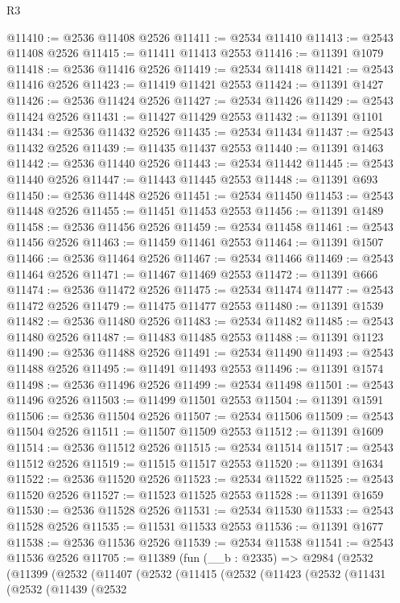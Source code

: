 \begin{lexlean}{R3}
\begin{coremodule}
@11410 := @2536 @11408 @2526
@11411 := @2534 @11410
@11413 := @2543 @11408 @2526
@11415 := @11411 @11413 @2553
@11416 := @11391 @1079
@11418 := @2536 @11416 @2526
@11419 := @2534 @11418
@11421 := @2543 @11416 @2526
@11423 := @11419 @11421 @2553
@11424 := @11391 @1427
@11426 := @2536 @11424 @2526
@11427 := @2534 @11426
@11429 := @2543 @11424 @2526
@11431 := @11427 @11429 @2553
@11432 := @11391 @1101
@11434 := @2536 @11432 @2526
@11435 := @2534 @11434
@11437 := @2543 @11432 @2526
@11439 := @11435 @11437 @2553
@11440 := @11391 @1463
@11442 := @2536 @11440 @2526
@11443 := @2534 @11442
@11445 := @2543 @11440 @2526
@11447 := @11443 @11445 @2553
@11448 := @11391 @693
@11450 := @2536 @11448 @2526
@11451 := @2534 @11450
@11453 := @2543 @11448 @2526
@11455 := @11451 @11453 @2553
@11456 := @11391 @1489
@11458 := @2536 @11456 @2526
@11459 := @2534 @11458
@11461 := @2543 @11456 @2526
@11463 := @11459 @11461 @2553
@11464 := @11391 @1507
@11466 := @2536 @11464 @2526
@11467 := @2534 @11466
@11469 := @2543 @11464 @2526
@11471 := @11467 @11469 @2553
@11472 := @11391 @666
@11474 := @2536 @11472 @2526
@11475 := @2534 @11474
@11477 := @2543 @11472 @2526
@11479 := @11475 @11477 @2553
@11480 := @11391 @1539
@11482 := @2536 @11480 @2526
@11483 := @2534 @11482
@11485 := @2543 @11480 @2526
@11487 := @11483 @11485 @2553
@11488 := @11391 @1123
@11490 := @2536 @11488 @2526
@11491 := @2534 @11490
@11493 := @2543 @11488 @2526
@11495 := @11491 @11493 @2553
@11496 := @11391 @1574
@11498 := @2536 @11496 @2526
@11499 := @2534 @11498
@11501 := @2543 @11496 @2526
@11503 := @11499 @11501 @2553
@11504 := @11391 @1591
@11506 := @2536 @11504 @2526
@11507 := @2534 @11506
@11509 := @2543 @11504 @2526
@11511 := @11507 @11509 @2553
@11512 := @11391 @1609
@11514 := @2536 @11512 @2526
@11515 := @2534 @11514
@11517 := @2543 @11512 @2526
@11519 := @11515 @11517 @2553
@11520 := @11391 @1634
@11522 := @2536 @11520 @2526
@11523 := @2534 @11522
@11525 := @2543 @11520 @2526
@11527 := @11523 @11525 @2553
@11528 := @11391 @1659
@11530 := @2536 @11528 @2526
@11531 := @2534 @11530
@11533 := @2543 @11528 @2526
@11535 := @11531 @11533 @2553
@11536 := @11391 @1677
@11538 := @2536 @11536 @2526
@11539 := @2534 @11538
@11541 := @2543 @11536 @2526
@11705 := @11389
    (fun (__b : @2335) =>
    @2984
      (@2532
        (@11399
          (@2532
            (@11407
              (@2532
                (@11415
                  (@2532
                    (@11423
                      (@2532
                        (@11431
                          (@2532
                            (@11439
                              (@2532

\end{coremodule}
\end{lexlean}
